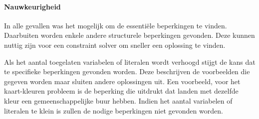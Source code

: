 \documentclass{llncs}
\begin{document}
\paragraph{Nauwkeurigheid}
In alle gevallen was het mogelijk om de essenti\"ele beperkingen te vinden.
Daarbuiten worden enkele andere structurele beperkingen gevonden.
Deze kunnen nuttig zijn voor een constraint solver om sneller een oplossing te vinden.

Als het aantal toegelaten variabelen of literalen wordt verhoogd stijgt de kans dat te specifieke beperkingen gevonden worden.
Deze beschrijven de voorbeelden die gegeven worden maar sluiten andere oplossingen uit.
Een voorbeeld, voor het kaart-kleuren probleem is de beperking die uitdrukt dat landen met dezelfde kleur een gemeenschappelijke buur hebben.
Indien het aantal variabelen of literalen te klein is zullen de nodige beperkingen niet gevonden worden.
\end{document}
